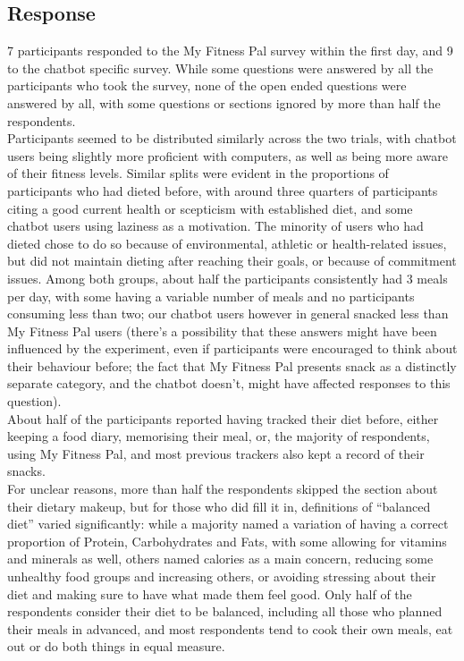 \subsection{Response}
7 participants responded to the My Fitness Pal survey within the first day, and 9 to the chatbot specific survey. While some questions were answered by all the participants who took the survey, none of the open ended questions were answered by all, with some questions or sections ignored by more than half the respondents. \\
Participants seemed to be distributed similarly across the two trials, with chatbot users being slightly more proficient with computers, as well as being more aware of their fitness levels. Similar splits were evident in the proportions of participants who had dieted before, with around three quarters of participants citing a good current health or scepticism with established diet, and some chatbot users using laziness as a motivation. The minority of users who had dieted chose to do so because of environmental, athletic or health-related issues, but did not maintain dieting after reaching their goals, or because of commitment issues. Among both groups, about half the participants consistently had 3 meals per day, with some having a variable number of meals and no participants consuming less than two; our chatbot users however in general snacked less than My Fitness Pal users (there's a possibility that these answers might have been influenced by the experiment, even if participants were encouraged to think about their behaviour before; the fact that My Fitness Pal presents snack as a distinctly separate category, and the chatbot doesn't, might have affected responses to this question). \\
About half of the participants reported having tracked their diet before, either keeping a food diary, memorising their meal, or, the majority of respondents, using My Fitness Pal, and most previous trackers also kept a record of their snacks. \\
For unclear reasons, more than half the respondents skipped the section about their dietary makeup, but for those who did fill it in, definitions of ``balanced diet'' varied significantly: while a majority named a variation of having a correct proportion of Protein, Carbohydrates and Fats, with some allowing for vitamins and minerals as well, others named calories as a main concern, reducing some unhealthy food groups and increasing others, or avoiding stressing about their diet and making sure to have what made them feel good. Only half of the respondents consider their diet to be balanced, including all those who planned their meals in advanced, and most respondents tend to cook their own meals, eat out or do both things in equal measure. \\
